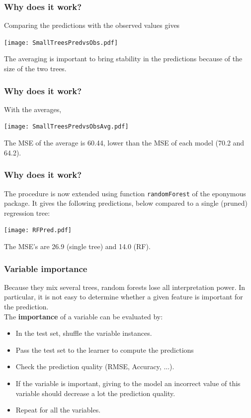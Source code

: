 \begin{frame}
\frametitle{Why does it work?}
Comparing the predictions with the observed values gives
\begin{center}
\texttt{[image: SmallTreesPredvsObs.pdf]}
\end{center}
The averaging is important to bring stability in the predictions because of the size of the two trees.
\end{frame}
\begin{frame}
\frametitle{Why does it work?}
With the averages,
\begin{center}
\texttt{[image: SmallTreesPredvsObsAvg.pdf]}
\end{center}
The MSE of the average is 60.44, lower than the MSE of each model (70.2 and 64.2).
\end{frame}
\begin{frame}
\frametitle{Why does it work?}
The procedure is now extended using function {\tt randomForest} of the eponymous package. It gives the following predictions, below compared to a single (pruned) regression tree:
\begin{center}
\texttt{[image: RFPred.pdf]}
\end{center}
The MSE's are 26.9 (single tree) and 14.0 (RF).
\end{frame}
\begin{frame}
\frametitle{Variable importance}
Because they mix several trees, random forests lose all interpretation power. In particular, it is not easy to determine whether a given feature is important for the prediction.\\
\vspace{0.3cm}
The {\bf importance} of a variable can be evaluated by:
\begin{itemize}
\item In the test set, shuffle the variable instances.
\item Pass the test set to the learner to compute the predictions
\item Check the prediction quality (RMSE, Accuracy, ...).
\item If the variable is important, giving to the model an incorrect value of this variable should decrease a lot the prediction quality. 
\item Repeat for all the variables.
\end{itemize}
\end{frame}
